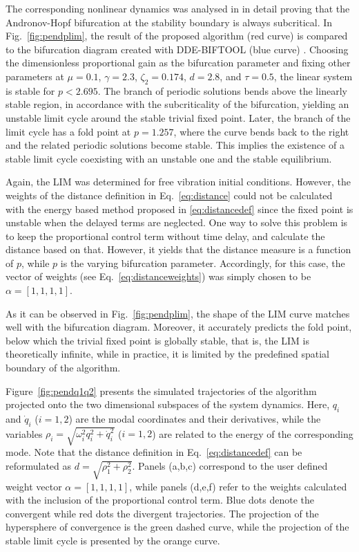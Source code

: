 \documentclass[preprint,12pt]{elsarticle}
\begin{document}
	The corresponding nonlinear dynamics was analysed in \cite{habib2019suppression} in detail proving that the Andronov-Hopf bifurcation at the stability boundary is always subcritical. 
	In Fig.~\ref{fig:pendplim}, the result of the proposed algorithm (red curve) is compared to the bifurcation diagram created with DDE-BIFTOOL (blue curve) \cite{engelborghs2002numerical}. Choosing the dimensionless proportional gain as the bifurcation parameter and fixing other parameters at $\mu=0.1$, $\gamma=2.3$, $\zeta_2=0.174$, $d=2.8$, and $\tau=0.5$, the linear system is stable for $p<2.695$. The branch of periodic solutions bends above the linearly stable region, in accordance with the subcriticality of the bifurcation, yielding an unstable limit cycle around the stable trivial fixed point. Later, the branch of the limit cycle has a fold point at $p=1.257$, where the curve bends back to the right and the related periodic solutions become stable. This implies the existence of a stable limit cycle coexisting with an unstable one and the stable equilibrium. 
	
	Again, the LIM was determined for free vibration initial conditions. However, the weights of the distance definition in Eq.~\eqref{eq:distance} could not be calculated with the energy based method proposed in \eqref{eq:distancedef} since the fixed point is unstable when the delayed terms are neglected. One way to solve this problem is to keep the proportional control term without time delay, and calculate the distance based on that. However, it yields that the distance measure is a function of $p$, while $p$ is the varying bifurcation parameter. Accordingly, for this case, the vector of weights (see Eq.~\ref{eq:distanceweights}) was simply chosen to be $\alpha=[1,1,1,1]$.
	
	As it can be observed in Fig.~\ref{fig:pendplim}, the shape of the LIM curve matches well with the bifurcation diagram. Moreover, it accurately predicts the fold point, below which the trivial fixed point is globally stable, that is, the LIM is theoretically infinite, while in practice, it is limited by the predefined spatial boundary of the algorithm. 
	
	Figure~\ref{fig:pendq1q2} presents the simulated trajectories of the algorithm projected onto the two dimensional subspaces of the system dynamics. Here, $q_i$ and $\dot{q}_i$ ($i=1,2$) are the modal coordinates and their derivatives, while the variables  $\rho_i = \sqrt{\omega_i^2q_i^2+\dot{q}_i^2}$ ($i=1,2$) are related to the energy of the corresponding mode. Note that the distance definition in Eq.~\eqref{eq:distancedef} can be reformulated as $d=\sqrt{\rho_1^2+\rho_2^2}$.
	Panels (a,b,c) correspond to the user defined weight vector $\alpha=[1,1,1,1]$, while panels (d,e,f) refer to the weights calculated with the inclusion of the proportional control term. Blue dots denote the convergent while red dots the divergent trajectories. The projection of the hypersphere of convergence is the green dashed curve, while the projection of the stable limit cycle is presented by the orange curve.
	
\end{document}
